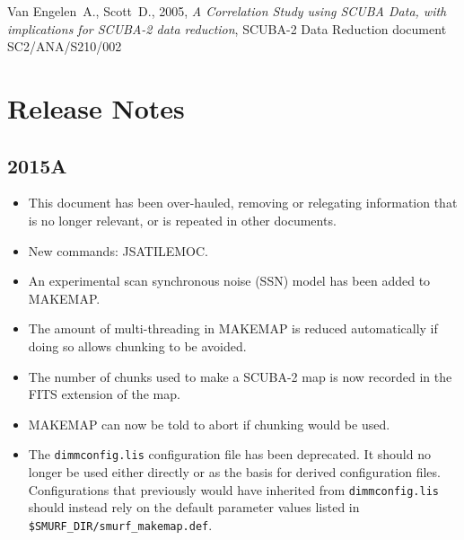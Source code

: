 \documentclass[oneside,11pt]{starlink}
\begin{document}
\begin{thebibliography}{}
Van Engelen~A., Scott~D., 2005, {\it A Correlation Study using SCUBA
  Data, with implications for SCUBA-2 data reduction},
  SCUBA-2 Data Reduction document SC2/ANA/S210/002



\end{thebibliography}

\section{Release Notes}

\subsection{2015A}
\begin{itemize}
\item This document has been over-hauled, removing or relegating
information that is no longer relevant, or is repeated in other documents.
\item New commands: JSATILEMOC.
\item An experimental scan synchronous noise (SSN) model has been added
to MAKEMAP.
\item The amount of multi-threading in MAKEMAP is reduced automatically if doing so
allows chunking to be avoided.
\item The number of chunks used to make a SCUBA-2 map is now recorded in the
FITS extension of the map.
\item MAKEMAP can now be told to abort if chunking would be used.
\item The \texttt{dimmconfig.lis} configuration file has been deprecated. It
should no longer be used either directly or as the basis for derived
configuration files. Configurations that previously would have inherited from 
\texttt{dimmconfig.lis} should instead rely on the default parameter values 
listed in \texttt{\$SMURF\_DIR/smurf\_makemap.def}.
\end{itemize}
\end{document}
